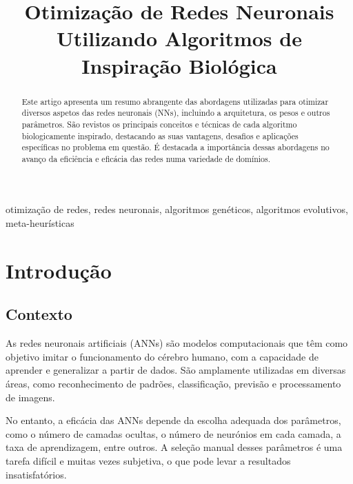 \documentclass[conference]{IEEEtran}
\begin{document}
\title{Otimização de Redes Neuronais Utilizando Algoritmos de Inspiração Biológica}

\author{
}
\maketitle

\begin{abstract}
    Este artigo apresenta um resumo abrangente das abordagens utilizadas para otimizar diversos aspetos das redes neuronais (NNs), incluindo a arquitetura, os pesos e outros parâmetros. São revistos os principais conceitos e técnicas de cada algoritmo biologicamente inspirado, destacando as suas vantagens, desafios e aplicações específicas no problema em questão. É destacada a importância dessas abordagens no avanço da eficiência e eficácia das redes numa variedade de domínios.
\end{abstract}

\begin{IEEEkeywords}
    otimização de redes, redes neuronais, algoritmos genéticos, algoritmos evolutivos, meta-heurísticas
\end{IEEEkeywords}

\section{Introdução}
\subsection{Contexto}

As redes neuronais artificiais (ANNs) são modelos computacionais que têm como objetivo imitar o funcionamento do cérebro humano, com a capacidade de aprender e generalizar a partir de dados. São amplamente utilizadas em diversas áreas, como reconhecimento de padrões, classificação, previsão e processamento de imagens. 

No entanto, a eficácia das ANNs depende da escolha adequada dos parâmetros, como o número de camadas ocultas, o número de neurónios em cada camada, a taxa de aprendizagem, entre outros. A seleção manual desses parâmetros é uma tarefa difícil e muitas vezes subjetiva, o que pode levar a resultados insatisfatórios.
\end{document}
